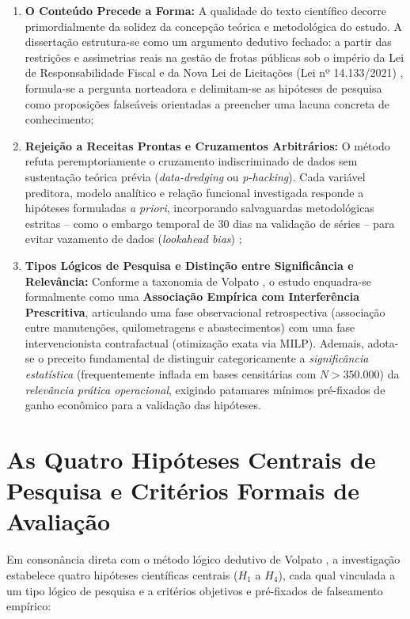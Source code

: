\begin{enumerate}
    \item \textbf{O Conteúdo Precede a Forma:} A qualidade do texto científico decorre primordialmente da solidez da concepção teórica e metodológica do estudo. A dissertação estrutura-se como um argumento dedutivo fechado: a partir das restrições e assimetrias reais na gestão de frotas públicas sob o império da Lei de Responsabilidade Fiscal e da Nova Lei de Licitações (Lei nº 14.133/2021) \cite{brasil2021licitacoes}, formula-se a pergunta norteadora e delimitam-se as hipóteses de pesquisa como proposições falseáveis orientadas a preencher uma lacuna concreta de conhecimento;
    
    \item \textbf{Rejeição a Receitas Prontas e Cruzamentos Arbitrários:} O método refuta peremptoriamente o cruzamento indiscriminado de dados sem sustentação teórica prévia (\textit{data-dredging} ou \textit{p-hacking}). Cada variável preditora, modelo analítico e relação funcional investigada responde a hipóteses formuladas \textit{a priori}, incorporando salvaguardas metodológicas estritas -- como o embargo temporal de 30 dias na validação de séries -- para evitar vazamento de dados (\textit{lookahead bias}) \cite{kapoor2023};
    
    \item \textbf{Tipos Lógicos de Pesquisa e Distinção entre Significância e Relevância:} Conforme a taxonomia de Volpato \cite{volpato2015}, o estudo enquadra-se formalmente como uma \textbf{Associação Empírica com Interferência Prescritiva}, articulando uma fase observacional retrospectiva (associação entre manutenções, quilometragens e abastecimentos) com uma fase intervencionista contrafactual (otimização exata via MILP). Ademais, adota-se o preceito fundamental de distinguir categoricamente a \textit{significância estatística} (frequentemente inflada em bases censitárias com $N > 350.000$) da \textit{relevância prática operacional}, exigindo patamares mínimos pré-fixados de ganho econômico para a validação das hipóteses.
\end{enumerate}

\section{As Quatro Hipóteses Centrais de Pesquisa e Critérios Formais de Avaliação}
\label{sec:hipoteses_centrais}

Em consonância direta com o método lógico dedutivo de Volpato \cite{volpato2017}, a investigação estabelece quatro hipóteses científicas centrais ($H_1$ a $H_4$), cada qual vinculada a um tipo lógico de pesquisa e a critérios objetivos e pré-fixados de falseamento empírico:

